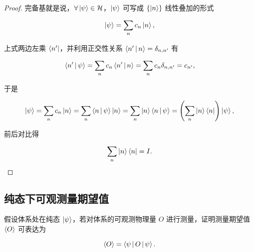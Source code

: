\begin{proof}

完备基就是说，$\forall \Ket{\psi } \in \mathcal{H} $，$\ket{\psi} $ 可写成 $\left\{\Ket{n } \right\} $ 线性叠加的形式

\begin{equation}
\Ket{\psi }
=\sum_n c_n \Ket{n },
\end{equation}

上式两边左乘 $\Bra{n' } $，并利用正交性关系 $\Braket{n'|n }=\delta_{n,n'} $ 有

\begin{equation}
\Braket{n'|\psi }
=\sum_{n} c_n \Braket{n'|n }
=\sum_{n} c_n \delta_{n,n'}
=c_{n'},
\end{equation}

于是

\begin{equation}
\Ket{\psi }
=\sum_n c_n \Ket{n }
=\sum_n \Braket{n | \psi } \Ket{n }
=\sum_n \Ket{n } \Braket{n | \psi }
=\left(\sum_n \Ket{n } \Bra{n } \right) \Ket{\psi },
\end{equation}

前后对比得

\begin{equation}
\sum_n \Ket{n }\Bra{n }
=I.
\end{equation}

\end{proof}

\subsection{纯态下可观测量期望值}

\begin{example}

假设体系处在纯态 $\Ket{\psi } $，若对体系的可观测物理量 $O $ 进行测量，证明测量期望值 $\Braket{O} $ 可表达为

\begin{equation}
\Braket{O}
=\Braket{\psi | O | \psi}.
\end{equation}

\end{example}

